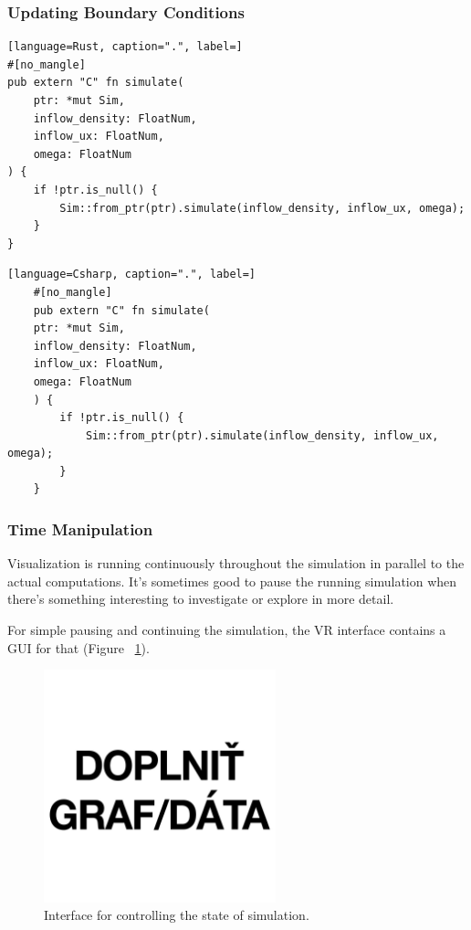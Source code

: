 \subsubsection{Updating Boundary Conditions}

\begin{lstlisting}[language=Rust, caption=".", label=]
#[no_mangle]
pub extern "C" fn simulate(
	ptr: *mut Sim,
	inflow_density: FloatNum,
	inflow_ux: FloatNum,
	omega: FloatNum
) {
	if !ptr.is_null() {
		Sim::from_ptr(ptr).simulate(inflow_density, inflow_ux, omega);
	}
}
\end{lstlisting}

\begin{lstlisting}[language=Csharp, caption=".", label=]
	#[no_mangle]
	pub extern "C" fn simulate(
	ptr: *mut Sim,
	inflow_density: FloatNum,
	inflow_ux: FloatNum,
	omega: FloatNum
	) {
		if !ptr.is_null() {
			Sim::from_ptr(ptr).simulate(inflow_density, inflow_ux, omega);
		}
	}
\end{lstlisting}

\subsubsection{Time Manipulation}

Visualization is running continuously throughout the simulation in parallel to the actual computations. It's sometimes good to pause the running simulation when there's something interesting to investigate or explore in more detail.

For simple pausing and continuing the simulation, the VR interface contains a GUI for that (Figure~ \ref{fig:unity-pause-play}).

\begin{figure}[!ht]
	\centering
	\includegraphics[width=0.6\textwidth]{figures/empty.jpg}
	\caption{Interface for controlling the state of simulation.}
	\label{fig:unity-pause-play}
\end{figure}

